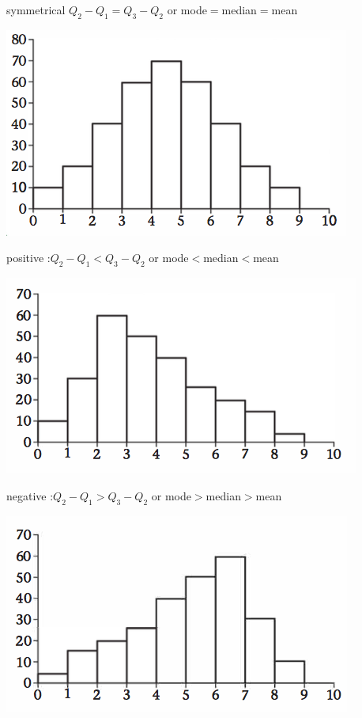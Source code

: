 \documentclass[a4paper]{article}
\begin{document}
symmetrical $Q_2-Q_1=Q_3-Q_2$ or mode$=$median$=$mean
\begin{center}
	\includegraphics[scale=0.5]{img_S/3_5_intro1}
\end{center}
positive :$Q_2-Q_1<Q_3-Q_2$ or mode$<$median$<$mean
\begin{center}
	\includegraphics[scale=0.5]{img_S/3_5_intro2}
\end{center}
negative :$Q_2-Q_1>Q_3-Q_2$ or mode$>$median$>$mean
\begin{center}
	\includegraphics[scale=0.5]{img_S/3_5_intro3}
\end{center}
\end{document}
